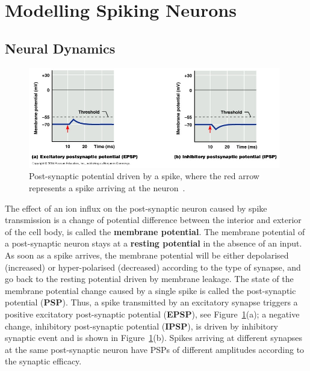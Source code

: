 \section{Modelling Spiking Neurons}
\label{sec:spike}

\subsection{Neural Dynamics}

\begin{figure}[tb!]
	\centering
	\includegraphics[width=0.98\textwidth]{pics_snn/EI_PSP.JPG}
	\caption{Post-synaptic potential driven by a spike, where the red arrow represents a spike arriving at the neuron~\citep{marieb2007human}.}
	\label{Fig:psp}
\end{figure}

The effect of an ion influx on the post-synaptic neuron caused by spike transmission is a change of potential difference between the interior and exterior of the cell body, \DIFdelbegin {}\DIFdelend \DIFaddbegin {}\DIFaddend is called the \textbf{membrane potential}.
The membrane potential of a post-synaptic neuron stays at a \textbf{resting potential} in the absence of an input.
As soon as a spike arrives, the membrane potential will be either depolarised (increased) or hyper-polarised (decreased) according to the type of synapse, and go back to the resting potential driven by \DIFdelbegin {}\DIFdelend membrane leakage.
The state of the membrane potential change caused by a single spike is called the post-synaptic potential (\textbf{PSP}). 
Thus, a spike transmitted by an excitatory synapse triggers a positive \DIFdelbegin {}\DIFdelend \DIFaddbegin {}\DIFaddend excitatory post-synaptic potential (\textbf{EPSP}), see Figure~\ref{Fig:psp}(a);
a negative change, \DIFaddbegin {}\DIFaddend inhibitory post-synaptic potential (\textbf{IPSP}), is driven by \DIFaddbegin {}\DIFaddend inhibitory synaptic event and is shown in Figure~\ref{Fig:psp}(b).
Spikes arriving at different synapses at the same post-synaptic neuron have PSPs of different amplitudes according to the synaptic efficacy.

